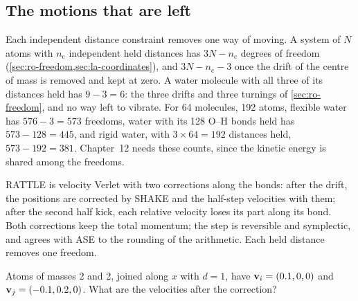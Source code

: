 \subsection*{The motions that are left}

Each independent distance constraint removes one way of moving. A system
of $N$ atoms with $n_{\mathrm c}$ independent held distances has $3N - n_{\mathrm c}$ degrees of
freedom (\cref{sec:ro-freedom,sec:la-coordinates}), and $3N - n_{\mathrm c} - 3$ once the
drift of the centre of mass is removed and kept at zero. A water molecule
with all three of its distances held has $9 - 3 = 6$: the three drifts and
three turnings of \cref{sec:ro-freedom}, and no way left to vibrate. For
64 molecules, 192 atoms, flexible water has $576 - 3 = 573$ freedoms,
water with its 128 O--H bonds held has $573 - 128 = 445$, and rigid water,
with $3\times64 = 192$ distances held, $573 - 192 = 381$.
Chapter~12 needs these counts, since the kinetic energy is shared among
the freedoms.

\begin{keyidea}
RATTLE is velocity Verlet with two corrections along the bonds: after the
drift, the positions are corrected by SHAKE and the half-step velocities
with them; after the second half kick, each relative velocity loses its
part along its bond. Both corrections keep the total momentum; the step
is reversible and symplectic, and agrees with ASE to the rounding of the
arithmetic. Each held distance removes one freedom.
\end{keyidea}


\begin{selfcheck}
Atoms of masses 2 and 2, joined along $x$ with $d = 1$, have $\bm{\mathrm{v}}_i =
(0.1, 0, 0)$ and $\bm{\mathrm{v}}_j = (-0.1, 0.2, 0)$. What are the velocities
after the correction?
\end{selfcheck}
